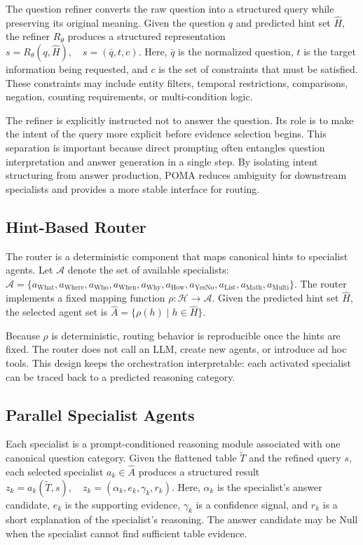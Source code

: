 \documentclass[]{interact}
\begin{document}
The question refiner converts the raw question into a structured query while preserving its original meaning. Given the question $q$ and predicted hint set $\hat{H}$, the refiner $R_{\theta}$ produces a structured representation $s=R_{\theta}(q,\hat{H}), \quad s=(\bar{q},t,c)$. Here, $\bar{q}$ is the normalized question, $t$ is the target information being requested, and $c$ is the set of constraints that must be satisfied. These constraints may include entity filters, temporal restrictions, comparisons, negation, counting requirements, or multi-condition logic.

The refiner is explicitly instructed not to answer the question. Its role is to make the intent of the query more explicit before evidence selection begins. This separation is important because direct prompting often entangles question interpretation and answer generation in a single step. By isolating intent structuring from answer production, POMA reduces ambiguity for downstream specialists and provides a more stable interface for routing.

\subsection{Hint-Based Router}

The router is a deterministic component that maps canonical hints to specialist agents. Let $\mathcal{A}$ denote the set of available specialists: $\mathcal{A}=\{a_{\text{What}},a_{\text{Where}},a_{\text{Who}},a_{\text{When}},a_{\text{Why}},a_{\text{How}},a_{\text{YesNo}},a_{\text{List}},a_{\text{Math}},a_{\text{Multi}}\}$. The router implements a fixed mapping function $\rho:\mathcal{H}\rightarrow \mathcal{A}$. Given the predicted hint set $\hat{H}$, the selected agent set is $\hat{A}=\{\rho(h)\mid h\in\hat{H}\}$.

Because $\rho$ is deterministic, routing behavior is reproducible once the hints are fixed. The router does not call an LLM, create new agents, or introduce ad hoc tools. This design keeps the orchestration interpretable: each activated specialist can be traced back to a predicted reasoning category.

\subsection{Parallel Specialist Agents}

Each specialist is a prompt-conditioned reasoning module associated with one canonical question category. Given the flattened table $\tilde{T}$ and the refined query $s$, each selected specialist $a_k\in\hat{A}$ produces a structured result $z_k=a_k(\tilde{T},s), \quad z_k=(\alpha_k,e_k,\gamma_k,r_k)$. Here, $\alpha_k$ is the specialist's answer candidate, $e_k$ is the supporting evidence, $\gamma_k$ is a confidence signal, and $r_k$ is a short explanation of the specialist's reasoning. The answer candidate may be Null when the specialist cannot find sufficient table evidence.
\end{document}
